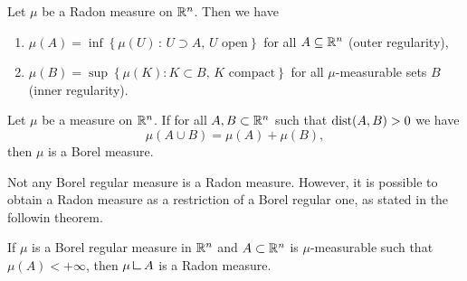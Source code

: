 \begin{theorem}
Let $\mu$ be a Radon measure on $\mathbb{R}^n$. Then we have
\begin{enumerate}[(1)]
\item $\mu(A) = \inf\left\{ \mu(U) \,:\,
U \supset A,\, U \text{ open}\right\}$ for all $A \subseteq \mathbb{R}^n$ \hfill (outer regularity),
\item $\mu(B) = \sup \left\{ \mu (K): K \subset B,\, K \text{ compact}\right\}$ for all $\mu$-measurable sets $B$ \hfill
(inner regularity).
\end{enumerate}
\end{theorem}

\begin{theorem} \label{caratheodory_criterion}
Let $\mu$ be a measure on $\mathbb{R}^n$. If for all $A,B \subset \mathbb{R}^n$ such that $\operatorname{dist}(A,B) > 0$ we have $$\mu(A \cup B) = \mu(A) + \mu(B),$$ then $\mu$
is a Borel measure.
\end{theorem}

Not any Borel regular measure is a Radon measure. However, it is possible to obtain a Radon measure as a restriction of a Borel regular one, as stated in the followin theorem.

\begin{theorem} \label{thm:Borel_restriction_Radon}
If $\mu$ is a Borel regular measure in $\mathbb{R}^n$ and $A \subset \mathbb{R}^n$ is
$\mu$-measurable such that $\mu(A) < + \infty$, then $\mu \res A$ is a Radon measure. 
\end{theorem}


